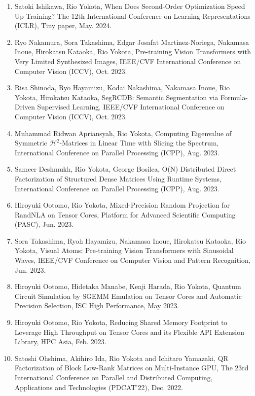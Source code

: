 \documentclass[margin,line]{cv}
\begin{document}
\begin{resume}
\begin{enumerate}
\item Satoki Ishikawa, Rio Yokota, When Does Second-Order Optimization Speed Up Training? The 12th International Conference on Learning Representations (ICLR), Tiny paper, May. 2024.

\item Ryo Nakamura, Sora Takashima, Edgar Josafat Martinez-Noriega, Nakamasa Inoue, Hirokatsu Kataoka, Rio Yokota, Pre-training Vision Transformers with Very Limited Synthesized Images, IEEE/CVF International Conference on Computer Vision (ICCV), Oct. 2023.

\item Risa Shinoda, Ryo Hayamizu, Kodai Nakashima, Nakamasa Inoue, Rio Yokota, Hirokatsu Kataoka, SegRCDB: Semantic Segmentation via Formula-Driven Supervised Learning, IEEE/CVF International Conference on Computer Vision (ICCV), Oct. 2023.

\item Muhammad Ridwan Apriansyah, Rio Yokota, Computing Eigenvalue of Symmetric $\mathcal{H}^2$-Matrices in Linear Time with Slicing the Spectrum, International Conference on Parallel Processing (ICPP), Aug. 2023.

\item Sameer Deshmukh, Rio Yokota, George Bosilca, O(N) Distributed Direct Factorization of Structured Dense Matrices Using Runtime Systems, International Conference on Parallel Processing (ICPP), Aug. 2023.

\item Hiroyuki Ootomo, Rio Yokota, Mixed-Precision Random Projection for RandNLA on Tensor Cores, Platform for Advanced Scientific Computing (PASC), Jun. 2023.

\item Sora Takashima, Ryoh Hayamizu, Nakamasa Inoue, Hirokatsu Kataoka, Rio Yokota, Visual Atoms: Pre-training Vision Transformers with Sinusoidal Waves, IEEE/CVF Conference on Computer Vision and Pattern Recognition, Jun. 2023.

\item Hiroyuki Ootomo, Hidetaka Manabe, Kenji Harada, Rio Yokota, Quantum Circuit Simulation by SGEMM Emulation on Tensor Cores and Automatic Precision Selection, ISC High Performance, May 2023.

\item Hiroyuki Ootomo, Rio Yokota, Reducing Shared Memory Footprint to Leverage High Throughput on Tensor Cores and its Flexible API Extension Library, HPC Asia, Feb. 2023.

\item Satoshi Ohshima, Akihiro Ida, Rio Yokota and Ichitaro Yamazaki, QR Factorization of Block Low-Rank Matrices on Multi-Instance GPU, The 23rd International Conference on Parallel and Distributed Computing, Applications and Technologies (PDCAT’22), Dec. 2022.


\end{enumerate}
\end{resume}
\end{document}
